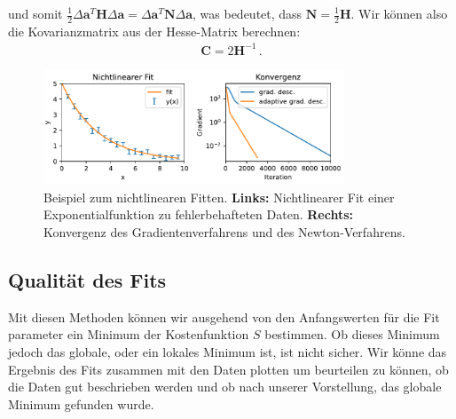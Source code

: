 und somit $\frac{1}{2} \Delta \boldsymbol{a}^T \boldsymbol{H} \Delta \boldsymbol{a} = \Delta \boldsymbol{a}^T \boldsymbol{N} \Delta \boldsymbol{a}$, was bedeutet, dass $\boldsymbol{N} = \frac{1}{2} \boldsymbol{H}$. Wir k\"onnen also die Kovarianzmatrix aus der Hesse-Matrix berechnen:
\begin{align}
\boldsymbol{C} = 2 \boldsymbol{H}^{-1}\,.
\label{eq:vl9-23}
\end{align}

\begin{figure}[tbp]
    \centering
        \includegraphics[width=0.8\textwidth]{Figures/nonlinear_fitting_image.pdf}
        \caption{Beispiel zum nichtlinearen Fitten. \textbf{Links:} Nichtlinearer Fit einer Exponentialfunktion zu fehlerbehafteten Daten. \textbf{Rechts:} Konvergenz des Gradientenverfahrens und des Newton-Verfahrens.  }
        \label{fig:nonlinearFit}
\end{figure} 

\subsection{Qualität des Fits}
\label{subsec:vl9-3}

Mit diesen Methoden können wir ausgehend von den Anfangswerten für die Fit parameter ein Minimum der Kostenfunktion $S$ bestimmen. Ob dieses Minimum jedoch das globale, oder ein lokales Minimum ist, ist nicht sicher. Wir könne das Ergebnis des Fits zusammen mit den Daten plotten um beurteilen zu können, ob die Daten gut beschrieben werden und ob nach unserer Vorstellung, das globale Minimum gefunden wurde.

